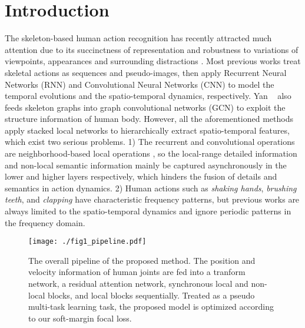 \documentclass{article}
\begin{document}
\section{Introduction}
\label{sec:intro}
The skeleton-based human action recognition has recently attracted much attention due to its succinctness of representation and robustness to variations of viewpoints, appearances and surrounding distractions \cite{DBLP:conf/iccv/ZhangLXZXZ17}. Most previous works treat skeletal actions as sequences and pseudo-images, then apply Recurrent Neural Networks (RNN) \cite{DBLP:conf/iccv/ZhangLXZXZ17,DBLP:conf/cvpr/ShahroudyLNW16,DBLP:conf/eccv/LiuSXW16} and Convolutional Neural Networks (CNN) \cite{DBLP:conf/cvpr/KeBASB17,DBLP:conf/ijcai/LiZXP18} to model the temporal evolutions and the spatio-temporal dynamics, respectively. Yan \etal~\cite{DBLP:conf/aaai/YanXL18} also feeds skeleton graphs into graph convolutional networks (GCN) to exploit the structure information of human body. However, all the aforementioned methods apply stacked local networks to hierarchically extract spatio-temporal features, which exist two serious problems. 1) The recurrent and convolutional operations are neighborhood-based local operations \cite{DBLP:journals/corr/abs-1711-07971}, so the local-range detailed information and non-local semantic information mainly be captured asynchronously in the lower and higher layers respectively, which hinders the fusion of details and semantics in action dynamics. 2) Human actions such as \textit{shaking hands}, \textit{brushing teeth}, and \textit{clapping} have characteristic frequency patterns, but previous works are always limited to the spatio-temporal dynamics and ignore periodic patterns in the frequency domain.

\begin{figure*}[tbp]
	\centering
	\texttt{[image: ./fig1\_pipeline.pdf]}
	\caption{The overall pipeline of the proposed method. The position and velocity information of human joints are fed into a tranform network, a residual attention network,  synchronous local and non-local blocks, and  local blocks sequentially. Treated as a pseudo multi-task learning task, the proposed model is optimized according to our soft-margin focal loss.}
	\label{fig_pipline}
\end{figure*}
\end{document}
